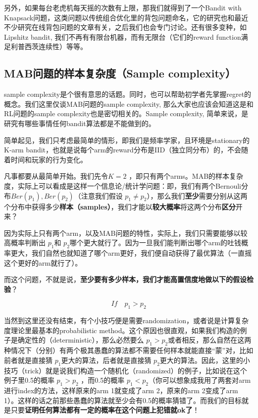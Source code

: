 \documentclass[12pt]{article}
\begin{document}
另外，如果每台老虎机每天摇的次数有上限，那我们就得到了一个Bandit with Knapsack问题，这类问题以传统组合优化里的背包问题命名，它的研究也和最近不少研究在线背包问题的文章有关，之后我们也会专门讨论。还有很多变种，如Lipshitz bandit, 我们不再有有限台机器，而有无限台（它们的reward function满足利普西茨连续性）等等。


\subsection{MAB问题的样本复杂度（Sample complexity）}
sample complexity是个很有意思的话题。同时，也可以帮助初学者先掌握regret的概念。我们这里仅谈MAB问题的sample complexity, 那么大家也应该会知道这是和RL问题的sample complexity也是密切相关的。Sample complexity, 简单来说，是研究有哪些事情任何bandit算法都是不能做到的。

简单起见，我们只考虑最简单的情形，即我们是频率学家，且环境是stationary的K-arm bandit，也就是说每个arm的reward分布是IID（独立同分布）的，不会随着时间和玩家的行为变化。

凡事都要从最简单开始。我们先令$K=2$ ，即只有两个arms。MAB的样本复杂度，实际上可以看成是这样一个信息论/统计学问题：即，我们有两个Bernouli分布$Ber(p_1), Ber(p_2)$（注意我们假设 $p_1 \neq p_2$），那么我们\textbf{至少}需要分别从这两个分布中获得多少\textbf{样本（samples）}，我们才能以\textbf{较大概率}将这两个分布\textbf{区分}开来？

因为实际上只有两个arm，以及MAB问题的特性，实际上，我们只需要能够以较高概率判断出 $p_1$和 $p_2$哪个更大就行了。因为一旦我们能判断出哪个arm的吐钱概率更大，我们自然也就知道了哪个arm更好，我们便自动获得了最优算法（一直摇这个更好的arm就行了）。

而这个问题，不就是说，\textbf{至少要有多少样本，我们才能高置信度地做以下的假设检验}？

$$
If \quad p_1 > p_2
$$

当然到这里还没有结束，有个小技巧便是需要randomization，或者说是计算复杂度理论里最基本的probabilistic method。这个原因也很直观，如果我们构造的例子是确定性的（deterministic），那么必然要么 $p_1 > p_2$或者相反，那么自然在这两种情况下（分别）有两个极其愚蠢的算法都不需要任何样本就能直接“蒙”对，比如前者就是直接猜 $p_1$更大的算法，后者就是直接猜 $p_2$更大的算法。因此，这里的小技巧（trick）就是说我们构造一个随机化（randomized）的例子，比如说在这个例子里0.5的概率 $p_1 > p_2$ ，而0.5的概率 $p_1 < p_2$（你可以想象成我用了两套对arm进行index的方法，这样原来的arm 1就变成了arm 2，原来的arm 2变成了arm 1）。这样的话之前那些愚蠢的算法就至少会有0.5的概率猜错了。而我们的目标就是只要\textbf{证明任何算法都有一定的概率在这个问题上犯错就ok了}！
\end{document}
